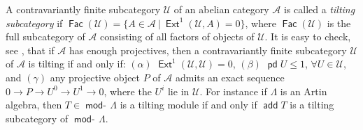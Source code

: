 \documentclass[oneside, a4paper,reqno]{amsart}
\numberwithin{equation}{section}
\theoremstyle{definition}
\begin{document}
A contravariantly finite subcategory ${\mathcal U}$ of an abelian category ${\mathscr A}$ is called a {\em tilting subcategory} if $\operatorname*{\mathsf{Fac}}({\mathcal U}) = \{A \in {\mathscr A} \ | \ \operatorname*{\mathsf{Ext}}^{1}({\mathcal U},A) = 0\}$, where $\operatorname*{\mathsf{Fac}}({\mathcal U})$ is the full subcategory of ${\mathscr A}$ consisting of all factors of objects  of ${\mathcal U}$. It is easy to check, see \cite{B:tilting}, that if ${\mathscr A}$ has enough projectives, then a contravariantly finite subcategory ${\mathcal U}$ of ${\mathscr A}$ is  tilting if and only if: $(\alpha)$ $\operatorname*{\mathsf{Ext}}^{1}({\mathcal U},{\mathcal U}) = 0$, $(\beta)$ $\operatorname{\mathsf{pd}} U \leq 1$, $\forall U \in {\mathcal U}$, and $(\gamma)$ any projective object $P$ of ${\mathscr A}$  admits an exact sequence $0 {\longrightarrow} P {\longrightarrow} U^{0} {\longrightarrow} U^{1} {\longrightarrow} 0$, where the $U^{i}$ lie in ${\mathcal U}$. For instance if $\Lambda$ is an Artin algebra, then $T \in \operatorname*{\mathsf{mod}-\!}\Lambda$ is a tilting module if and only if $\operatorname*{\mathsf{add}} T$ is a tilting subcategory of $\operatorname*{\mathsf{mod}-\!}\Lambda$.   
\end{document}
